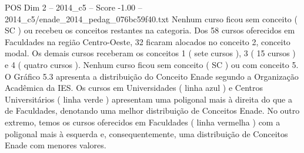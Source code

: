 \begin{textsample}{POS Dim 2 – 2014\_c5 – Score -1.00 – 2014\_c5/enade\_2014\_pedag\_076bc59f40.txt}
Nenhum curso ficou sem conceito ( SC ) ou recebeu os conceitos restantes na categoria.
Dos 58 cursos oferecidos em Faculdades na região Centro-Oeste, 32 ficaram alocados no conceito 2, conceito modal.
Os demais cursos receberam os conceitos 1 ( sete cursos ), 3 ( 15 cursos ) e 4 ( quatro cursos ).
Nenhum curso ficou sem conceito ( SC ) ou com conceito 5.
O Gráfico 5.3 apresenta a distribuição do Conceito Enade segundo a Organização Acadêmica da IES.
Os cursos em Universidades ( linha azul ) e Centros Universitários ( linha verde ) apresentam uma poligonal mais à direita do que a de Faculdades, denotando uma melhor distribuição de Conceitos Enade.
No outro extremo, temos os cursos oferecidos em Faculdades ( linha vermelha ) com a poligonal mais à esquerda e, consequentemente, uma distribuição de Conceitos Enade com menores valores.

\end{textsample}
